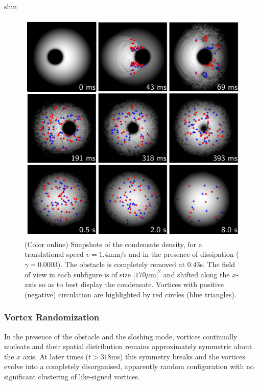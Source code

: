 \begin{chapter}{\label{cha:shin}shin}
\begin{figure}
\centering
\includegraphics[width=0.7\linewidth]{shin/fig2}
\caption{\label{fig:densSnapshots} (Color online) Snapshots of the condensate density, for a translational speed $v=1.4$mm/s and in the presence of dissipation ($\gamma=0.0003$). The obstacle is completely removed at $0.43$s. The field of view in each subfigure is of size $[170\mu$m$]^2$ and shifted along the $x$-axis so as to best display the condensate.  Vortices with positive (negative) circulation are highlighted by red circles (blue triangles).
}
\end{figure}

\subsubsection{Vortex Randomization}
In the presence of the obstacle and the sloshing mode,
vortices continually nucleate and their spatial distribution remains
approximately symmetric about the $x$ axis.  
At later times ($t>318$ms) this symmetry breaks and the vortices 
evolve into a completely disorganised, apparently random 
configuration with no significant clustering of like-signed vortices.  


\end{chapter}
